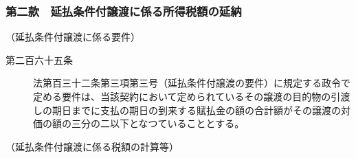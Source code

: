 \documentclass[twocolumn,a4j,10pt]{ltjtarticle}
\begin{document}
\subsubsection*{第二款　延払条件付譲渡に係る所得税額の延納}
\noindent\hspace{10pt}（延払条件付譲渡に係る要件）
\begin{description}
\item[第二百六十五条]法第百三十二条第三項第三号（延払条件付譲渡の要件）に規定する政令で定める要件は、当該契約において定められているその譲渡の目的物の引渡しの期日までに支払の期日の到来する賦払金の額の合計額がその譲渡の対価の額の三分の二以下となつていることとする。
\end{description}
\noindent\hspace{10pt}（延払条件付譲渡に係る税額の計算等）
\end{document}
